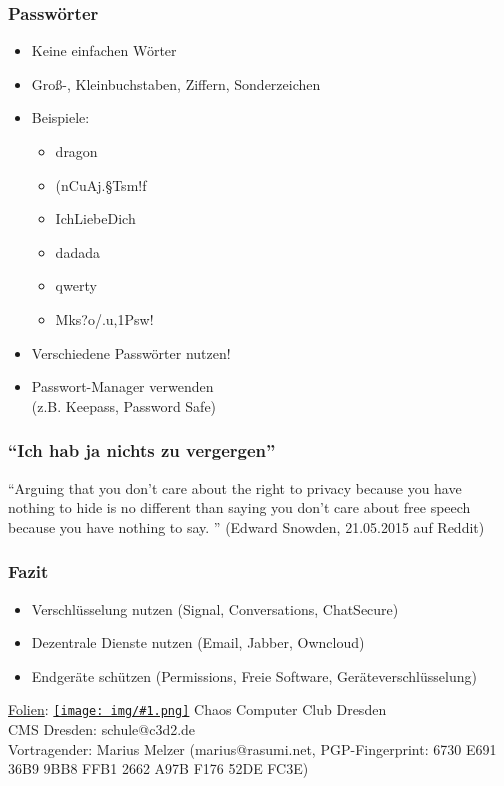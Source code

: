 \documentclass[12pt, xcolor={svgnames,table}]{beamer}
\newcommand{\cc}[1]{\texttt{[image: img/\#1.png]}\hspace{1mm}}
\begin{document}
\begin{frame}
    \frametitle{Passwörter}
    \begin{itemize}
        \item<2-> Keine einfachen Wörter
        \item<3-> Groß-, Kleinbuchstaben, Ziffern, Sonderzeichen
        \item<4-> Beispiele:
            \begin{itemize}
                \item<5-> dragon
                \item<6-> (nCuAj.§Tsm!f
                \item<7-> IchLiebeDich
                \item<8-> dadada
                \item<9-> qwerty
                \item<10-> Mks?o/.u,1Psw!
            \end{itemize}
        \item<12-> Verschiedene Passwörter nutzen!
        \item<13-> Passwort-Manager verwenden \\ (z.B. Keepass, Password Safe)
    \end{itemize}
\end{frame}

\begin{frame}
    \frametitle{``Ich hab ja nichts zu vergergen''}
    \begin{center}
      ``Arguing that you don't care about the right to privacy because you have nothing to hide is no different than saying you don't care about free speech because you have nothing to say. ''
      (Edward Snowden, 21.05.2015 auf Reddit)
    \end{center}
\end{frame}

\begin{frame}
  \frametitle{Fazit}
  \begin{center}
    \begin{itemize}
      \item Verschlüsselung nutzen (Signal, Conversations, ChatSecure)
      \item Dezentrale Dienste nutzen (Email, Jabber, Owncloud)
      \item Endgeräte schützen (Permissions, Freie Software, Geräteverschlüsselung)
    \end{itemize}

    \vspace{5mm}
    \href{https://github.com/c3d2/cms-nsa}{Folien}: \href{https://creativecommons.org/licenses/by-sa/4.0/}{\cc{by-sa}} Chaos Computer Club Dresden \\
    \vspace{3mm}
    CMS Dresden: schule@c3d2.de\\
    Vortragender: Marius Melzer (marius@rasumi.net, PGP-Fingerprint: 6730 E691 36B9 9BB8 FFB1 2662 A97B F176 52DE FC3E)
  \end{center}
\end{frame}
\end{document}
